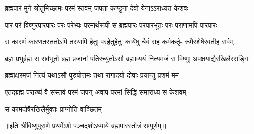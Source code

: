 \begingroup
\setmainfont[Script=Devanagari,Mapping=tex-text,FakeStretch=0.925]{Adobe Devanagari}
\fontsize{16pt}{19pt}\selectfont
{}

\addtocounter{shlokacount}{53}

\twolineshloka
{ब्रह्मपारं मुने श्रोतुमिच्छामः परमं स्तवम्}
{जपता कण्डुना देवो येनाऽऽराध्यत केशवः} %

\fourlineindentedshloka
{पारं परं विष्णुरपारपारः}
{परः परेभ्यः परमार्थरूपी}
{स ब्रह्मपारः परपारभूतः}
{परः पराणामपि पारपारः} %

\fourlineindentedshloka
{स कारणं कारणतस्ततोऽपि}
{तस्यापि हेतुः परहेतुहेतुः}
{कार्येषु चैवं सह कर्मकर्तृ-}
{रूपैरशेषैरवतीह सर्वम्} %

\fourlineindentedshloka
{ब्रह्म प्रभुर्ब्रह्म स सर्वभूतो}
{ब्रह्म प्रजानां पतिरच्युतोऽसौ} 
{ब्रह्माव्ययं नित्यमजं स विष्णुः}
{अपक्षयाद्यैरखिलैरसङ्गिः} %

\twolineshloka
{ब्रह्माक्षरमजं नित्यं यथाऽसौ पुरुषोत्तमः}
{तथा रागादयो दोषाः प्रयान्तु प्रशमं मम} %


\twolineshloka
{एतद्ब्रह्म पराख्यं वै संस्तवं परमं जपन्}
{अवाप परमां सिद्धिं समाराध्य स केशवम्} %

{स कामदोषैरखिलैर्मुक्तः प्राप्नोति वाञ्छितम्} %

॥इति श्रीविष्णुपुराणे प्रथमेंऽशे पञ्चदशोऽध्याये ब्रह्मपारस्तोत्रं सम्पूर्णम्॥ 

\endgroup